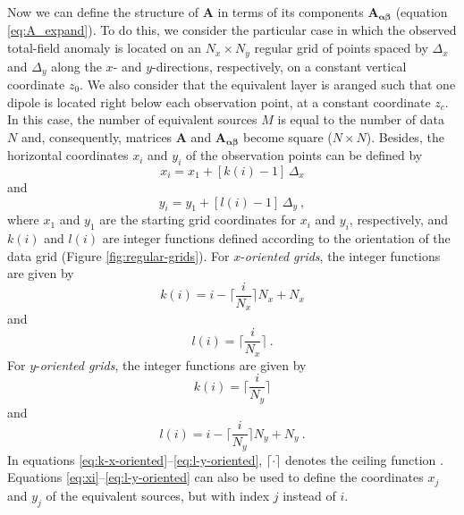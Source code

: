 \documentclass[manuscript,noblind]{geophysics}
\begin{document}
Now we can define the structure of $\mathbf{A}$ in terms of its components 
$\mathbf{A_{\boldsymbol{\alpha\beta}}}$ (equation \ref{eq:A_expand}). To do this, 
we consider the particular case in which the observed total-field anomaly is located 
on an $N_{x} \times N_{y}$ 
regular grid of points spaced by $\Delta_{x}$ and $\Delta_{y}$ along the $x$- and $y$-directions,
respectively, on a constant vertical coordinate $z_{0}$. We also consider that the equivalent layer
is aranged such that one dipole is located right below each observation point, at a constant coordinate $z_{c}$.
In this case, the number of equivalent sources $M$ is equal to the number of data $N$ and, 
consequently, matrices $\mathbf{A}$ and $\mathbf{A_{\boldsymbol{\alpha\beta}}}$ become 
square ($N \times N$). 
Besides, the horizontal coordinates $x_{i}$ and $y_{i}$ of the observation points 
can be defined by
\begin{equation}
	x_{i} = x_{1} + \left[ k(i) - 1 \right] \, \Delta_{x}
	\label{eq:xi}
\end{equation}
and
\begin{equation}
	y_{i} = y_{1} + \left[ l(i) - 1 \right] \, \Delta_{y} \: ,
	\label{eq:yi}
\end{equation}
where $x_{1}$ and $y_{1}$ are the starting grid coordinates for $x_{i}$ and $y_{i}$, respectively,
and $k(i)$ and $l(i)$ are integer functions defined according to the orientation
of the data grid (Figure \ref{fig:regular-grids}). 
For $x$-\textit{oriented grids}, the integer functions are given by
\begin{equation}
	k(i)  = i - \Bigg\lceil \frac{i}{N_{x}} \Bigg\rceil N_{x} + N_{x}
	\label{eq:k-x-oriented}
\end{equation}
and
\begin{equation}
	l(i) = \Bigg\lceil \frac{i}{N_{x}} \Bigg\rceil \: .
	\label{eq:l-x-oriented}
\end{equation}
For $y$-\textit{oriented grids}, the integer functions are given by
\begin{equation}
	k(i) = \Bigg\lceil \frac{i}{N_{y}} \Bigg\rceil
	\label{eq:k-y-oriented}
\end{equation}
and
\begin{equation}
	l(i) = i - \Bigg\lceil \frac{i}{N_{y}} \Bigg\rceil N_{y} + N_{y} \: .
	\label{eq:l-y-oriented}
\end{equation}
In equations \ref{eq:k-x-oriented}--\ref{eq:l-y-oriented}, $\lceil \cdot \rceil$ denotes the ceiling 
function \citep[e.g.,][ p. 67-68]{graham-etal1994}.
Equations \ref{eq:xi}--\ref{eq:l-y-oriented} can also be used to define the coordinates 
$x_{j}$ and $y_{j}$ of the equivalent sources, but with index $j$ instead of $i$.
\end{document}
